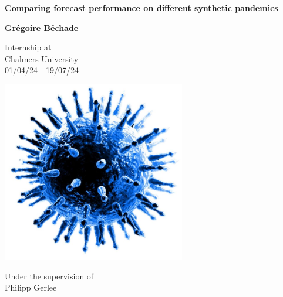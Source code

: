 \documentclass[11pt,a4paper]{article}
\begin{document}
\begin{titlepage}
    \begin{center}
        \vspace*{1cm}
        
        \Huge
        \textbf{Comparing forecast performance on different synthetic pandemics}
        
        \vspace{0.5cm}
        \LARGE
        
        \vspace{1.5cm}
        
        \textbf{Grégoire Béchade}
        
        \vfill
        
        \Large
        Internship at \\
        Chalmers University \\
        01/04/24 - 19/07/24
        
        \vspace{0.8cm}
        
        \includegraphics[width=0.6\textwidth]{figures/le virus_découpé_bis.jpg}
        
        \vfill
        
        \Large
        Under the supervision of \\
        Philipp Gerlee
        
        \vspace{0.8cm}
        
    \end{center}
\end{titlepage}

\newpage
\thispagestyle{empty}
\mbox{}
\newpage

\tableofcontents
\newpage







\newpage
\printbibliography %
\newpage

\end{document}
